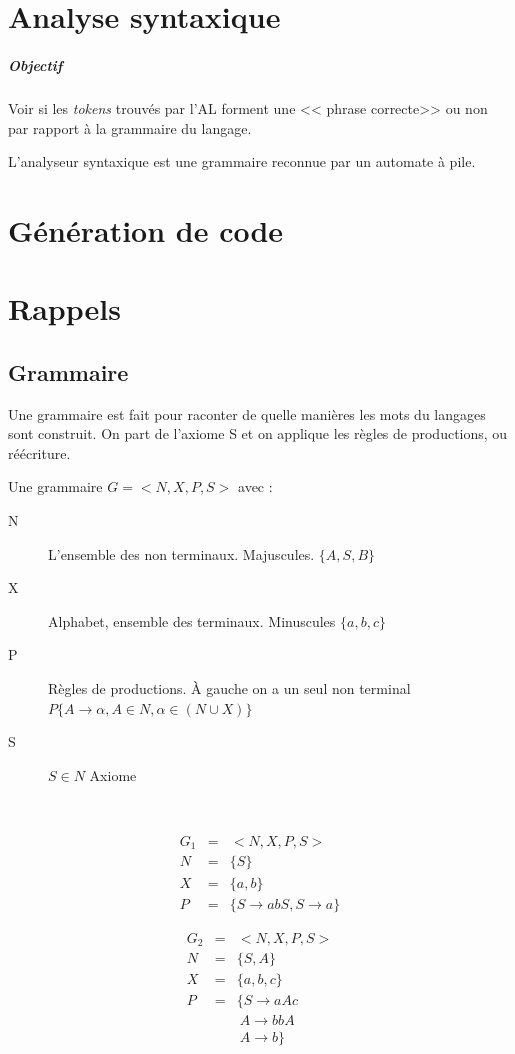 \documentclass[12pt,a4paper,openany]{book}
\newcommand{\tokens}{\textit{tokens} }
\begin{document}
	\chapter{Analyse syntaxique}
	\paragraph{Objectif} Voir si les \tokens trouvés par l'AL forment une << phrase correcte>> ou non par rapport à la grammaire du langage.

	L'analyseur syntaxique est une grammaire reconnue par un automate à pile.
	\chapter{Génération de code}

	\appendix
	\chapter{Rappels}
	\section{Grammaire}
	Une grammaire est fait pour raconter de quelle manières les mots du langages sont construit. On part de l'axiome S et on applique les règles de
	productions, ou réécriture.

	Une grammaire $G=<N,X,P,S>$ avec : 
	\begin{description}
		\item[N] L'ensemble des non terminaux. Majuscules. $\{A,S,B\}$
		\item[X] Alphabet, ensemble des terminaux. Minuscules $\{a,b,c\}$
		\item[P] Règles de productions. À gauche on a un seul non terminal $P\{A \rightarrow \alpha, A\in N, \alpha\in(N \cup X)\}$ 
		\item[S] $S\in N$ Axiome 
	\end{description}
~

\begin{exemple}
	\begin{eqnarray*}
	G_1&=& <N,X,P,S>\\
	N&=& \{S\}\\
	X&=& \{a,b\}\\
	P&=& \{S \rightarrow abS, S\rightarrow a\}
	\end{eqnarray*}
	\end{exemple}
	\begin{exemple}
	\begin{eqnarray*}
		G_2 &=&  <N,X,P,S>\\
		N &=& \{S,A\}\\
		X&=& \{a,b,c\}\\
		P&=& \{S \rightarrow aAc\\
		&& \ A\rightarrow bbA\\
		&& \ A\rightarrow b\}
	\end{eqnarray*}
\end{exemple}
\end{document}
